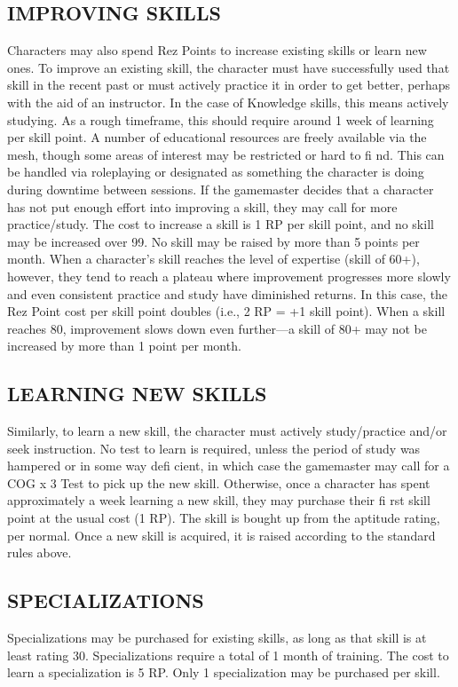  \subsection{IMPROVING SKILLS}
Characters may also spend Rez Points to increase
existing skills or learn new ones. To improve an existing
skill, the character must have successfully used
that skill in the recent past or must actively practice
it in order to get better, perhaps with the aid of an
instructor. In the case of Knowledge skills, this means
actively studying. As a rough timeframe, this should
require around 1 week of learning per skill point. A
number of educational resources are freely available
via the mesh, though some areas of interest
may be restricted or hard to fi nd. This can
be handled via roleplaying or designated
as something the character is doing during
downtime between sessions. If the gamemaster
decides that a character has not put
enough effort into improving a skill, they
may call for more practice/study.
The cost to increase a skill is 1 RP per skill
point, and no skill may be increased over 99.
No skill may be raised by more than 5 points
per month. When a character’s skill reaches
the level of expertise (skill of 60+), however,
they tend to reach a plateau where improvement
progresses more slowly and even consistent
practice and study have diminished returns.
In this case, the Rez Point cost per skill
point doubles (i.e., 2 RP = +1 skill point).
When a skill reaches 80, improvement slows
down even further—a skill of 80+ may not
be increased by more than 1 point per month.

 \subsection{LEARNING NEW SKILLS}
Similarly, to learn a new skill, the character
must actively study/practice and/or seek
instruction. No test to learn is required,
unless the period of study was hampered
or in some way defi cient, in which case the
gamemaster may call for a COG x 3 Test
to pick up the new skill. Otherwise, once a
character has spent approximately a week
learning a new skill, they may purchase their
fi rst skill point at the usual cost (1 RP). The
skill is bought up from the aptitude rating,
per normal. Once a new skill is acquired, it is
raised according to the standard rules above.

 \subsection{SPECIALIZATIONS}
Specializations may be purchased for existing
skills, as long as that skill is at least
rating 30. Specializations require a total
of 1 month of training. The cost to learn a
specialization is 5 RP. Only 1 specialization
may be purchased per skill.

